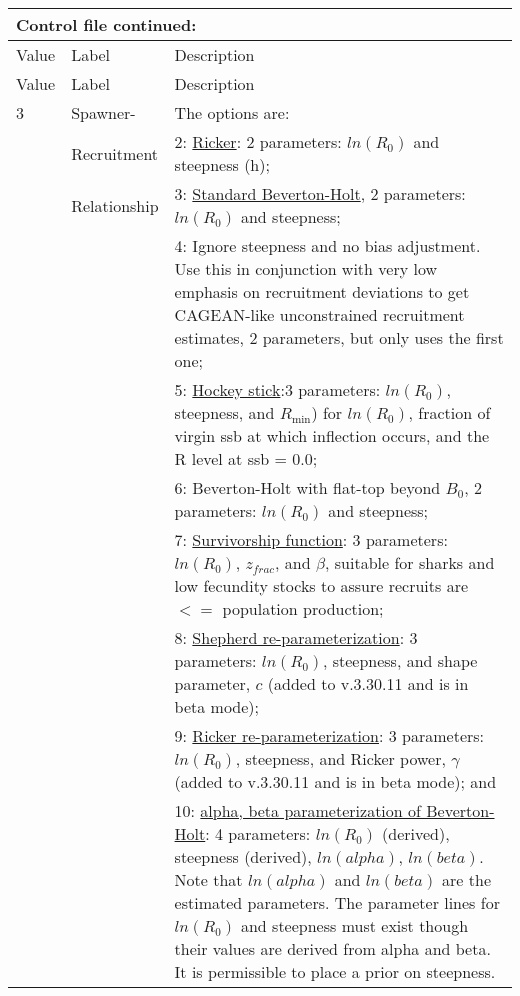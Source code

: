 \begin{longtable}{p{1cm} p{3cm} p{11cm}}
	\multicolumn{3}{l}{Control file continued:} \\
	\hline
	Value & Label & Description \Tstrut\Bstrut\\
	\hline
	\endfirsthead

	\hline
	Value & Label & Description \Tstrut\Bstrut\\
	\hline
	\endhead
	\hline
	\endfoot
	\endlastfoot

	3 & Spawner-            & The options are: \Tstrut\\
	  & Recruitment         & 2: \hyperlink{Ricker}{Ricker}: 2 parameters: $ln(R_{0})$ and steepness (h); \\
	  & Relationship        & 3: \hyperlink{BH}{Standard Beverton-Holt}, 2 parameters: $ln(R_{0})$ and steepness; \\
	  &                     & 4: Ignore steepness and no bias adjustment. Use this in conjunction with very low emphasis on recruitment deviations to get CAGEAN-like unconstrained recruitment estimates, 2 parameters, but only uses the first one; \\
	  &                     & 5: \hyperlink{Hockey}{Hockey stick}:3 parameters: $ln(R_{0})$, steepness, and $R_{\text{min}}$) for $ln(R_{0})$, fraction of virgin \gls{ssb} at which inflection occurs, and the R level at \gls{ssb} = 0.0; \\
	  &                     & 6: Beverton-Holt with flat-top beyond $B_{0}$, 2 parameters: $ln(R_{0})$ and steepness; \\
	  &                     & 7: \hyperlink{Survivorship}{Survivorship function}: 3 parameters: $ln(R_{0})$, $z_{frac}$, and $\beta$, suitable for sharks and low fecundity stocks to assure recruits are $<=$ population production; \\
	  & 					& 8: \hyperlink{Shepherd}{Shepherd re-parameterization}: 3 parameters: $ln(R_{0})$, steepness, and shape parameter, $c$ (added to v.3.30.11 and is in beta mode); \\
	  & 					& 9: \hyperlink{Ricker2}{Ricker re-parameterization}: 3 parameters: $ln(R_{0})$, steepness, and Ricker power, $\gamma$ (added to v.3.30.11 and is in beta mode); and \\
	  &                     & 10: \hyperlink{BH-ab}{alpha, beta parameterization of Beverton-Holt}: 4 parameters: $ln(R_{0})$ (derived), steepness (derived), $ln(alpha)$, $ln(beta)$. Note that $ln(alpha)$ and $ln(beta)$ are the estimated parameters. The parameter lines for $ln(R_{0})$ and steepness must exist though their values are derived from alpha and beta. It is permissible to place a prior on steepness. \\


\end{longtable}
